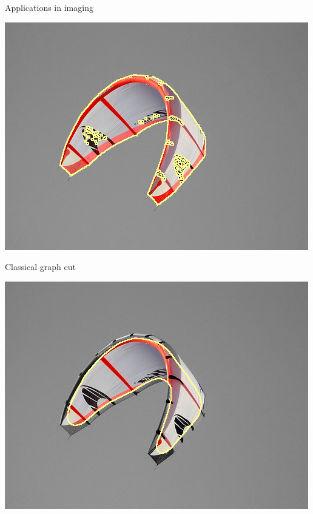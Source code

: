 \begin{frame}
{Applications in imaging}

\begin{minipage}[t][0.45\textheight][t]{\textwidth}
\center
\includegraphics[scale=0.22]{figures/applications-imaging/contour-correction/kite/gc-seg.png}

Classical graph cut
\end{minipage}
\begin{minipage}[t][0.55\textheight][t]{0.5\textwidth}
\center
\includegraphics[scale=0.22]{figures/applications-imaging/contour-correction/kite/corrected-seg-without-data.png}


\end{minipage}
\end{frame}
